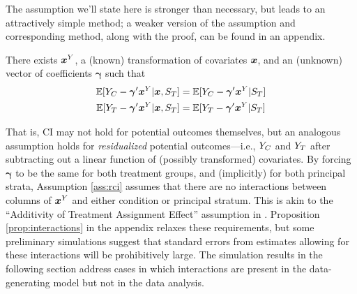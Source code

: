 \documentclass[]{article}
\begin{document}
The assumption we'll state here is stronger than necessary, but leads to an attractively simple method; a weaker version of the assumption and corresponding method, along with the proof, can be found in an appendix.

\begin{ass}\label{ass:rci}
There exists $\bm{x}^Y$, a (known) transformation of covariates $\bm{x}$, and an (unknown) vector of coefficients $\bm{\gamma}$ such that
\begin{equation}\label{eq:ass:rci}
\begin{split}
\mathbb{E}[Y_C-\bm{\gamma}'\bm{x}^Y|\bm{x},S_T]&=\mathbb{E}[Y_C-\bm{\gamma}'\bm{x}^Y|S_T]\\
\mathbb{E}[Y_T-\bm{\gamma}'\bm{x}^Y|\bm{x},S_T]&=\mathbb{E}[Y_T-\bm{\gamma}'\bm{x}^Y|S_T]
\end{split}
\end{equation}
\end{ass}
That is, CI may not hold for potential outcomes themselves, but an analogous assumption holds for \emph{residualized} potential outcomes---i.e., $Y_C$ and $Y_T$ after subtracting out a linear function of (possibly transformed) covariates.
By forcing $\bm{\gamma}$ to be the same for both treatment groups, and (implicitly) for both principal strata, Assumption \ref{ass:rci} assumes that there are no interactions between columns of $\bm{x}^Y$ and either condition or principal stratum.
This is akin to the ``Additivity of Treatment Assignment Effect'' assumption in \citet{jo2002}.
Proposition \ref{prop:interactions} in the appendix relaxes these requirements, but some preliminary simulations suggest that standard errors from estimates allowing for these interactions will be prohibitively large.
The simulation results in the following section address cases in which interactions are present in the data-generating model but not in the data analysis.
\end{document}
